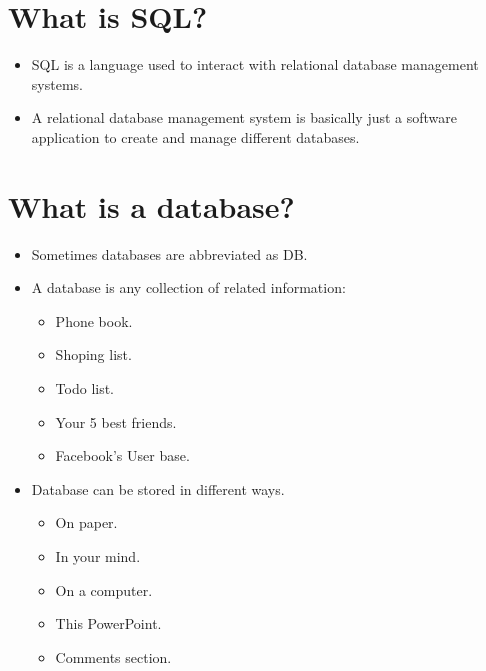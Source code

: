 \section{What is SQL?}
\begin{itemize}
    \item SQL is a language used to interact with relational database management systems.
    \item A relational database management system is basically just a software application to create and manage different databases.
\end{itemize}


\section{What is a database?}
\begin{itemize}
    \item Sometimes databases are abbreviated as DB.
    \item A database is any collection of related information:
        \begin{itemize}
            \item Phone book.
            \item Shoping list.
            \item Todo list.
            \item Your 5 best friends.
            \item Facebook's User base.
        \end{itemize}
    
    \item Database can be stored in different ways.
        \begin{itemize}
            \item On paper.
            \item In your mind.
            \item On a computer.
            \item This PowerPoint.
            \item Comments section.
        \end{itemize}
\end{itemize}

